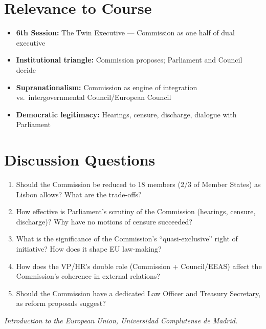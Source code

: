 \documentclass[11pt,a4paper]{article}
\begin{document}
\section*{Relevance to Course}

\begin{itemize}
\item \textbf{6th Session:} The Twin Executive --- Commission as one half of dual executive
\item \textbf{Institutional triangle:} Commission proposes; Parliament and Council decide
\item \textbf{Supranationalism:} Commission as engine of integration vs.\ intergovernmental Council/European Council
\item \textbf{Democratic legitimacy:} Hearings, censure, discharge, dialogue with Parliament
\end{itemize}

\section*{Discussion Questions}

\begin{enumerate}
\item Should the Commission be reduced to 18 members (2/3 of Member States) as Lisbon allows? What are the trade-offs?
\item How effective is Parliament's scrutiny of the Commission (hearings, censure, discharge)? Why have no motions of censure succeeded?
\item What is the significance of the Commission's ``quasi-exclusive'' right of initiative? How does it shape EU law-making?
\item How does the VP/HR's double role (Commission + Council/EEAS) affect the Commission's coherence in external relations?
\item Should the Commission have a dedicated Law Officer and Treasury Secretary, as reform proposals suggest?
\end{enumerate}

\vspace{1em}
\noindent\footnotesize\textit{Introduction to the European Union, Universidad Complutense de Madrid.}
\end{document}
